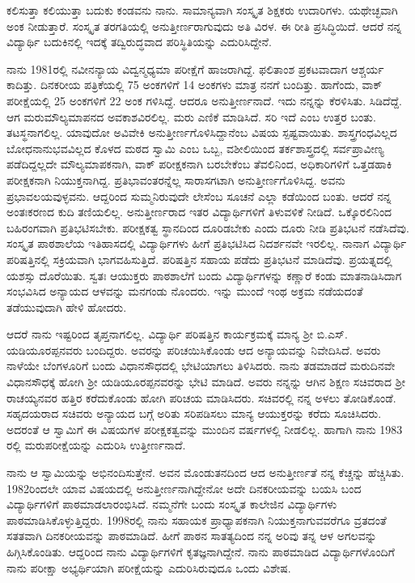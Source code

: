 {ಕಲಿಸುತ್ತಾ ಕಲಿಯುತ್ತಾ ಬದುಕು ಕಂಡವನು ನಾನು. ಸಾಮಾನ್ಯವಾಗಿ ಸಂಸ್ಕೃತ ಶಿಕ್ಷಕರು ಉದಾರಿಗಳು.  ಯಥೇಚ್ಛವಾಗಿ ಅಂಕ ನೀಡುತ್ತಾರೆ.  ಸಂಸ್ಕೃತ ತರಗತಿಯಲ್ಲಿ ಅನುತ್ತೀರ್ಣರಾಗುವುದು ಅತಿ ವಿರಳ. ಈ ರೀತಿ ಪ್ರಸಿದ್ಧಿಯಿದೆ. ಆದರೆ ನನ್ನ ವಿದ್ಯಾರ್ಥಿ ಬದುಕಿನಲ್ಲಿ ಇದಕ್ಕೆ ತದ್ವಿರುದ್ಧವಾದ ಪರಿಸ್ಥಿತಿಯನ್ನು ಎದುರಿಸಿದ್ದೇನೆ.  

ನಾನು 1981ರಲ್ಲಿ ನವೀನನ್ಯಾಯ ವಿದ್ವನ್ಮಧ್ಯಮಾ ಪರೀಕ್ಷೆಗೆ ಹಾಜರಾಗಿದ್ದೆ.  ಫಲಿತಾಂಶ ಪ್ರಕಟವಾದಾಗ ಆಶ್ಚರ್ಯ ಕಾದಿತ್ತು.  ದಿನಕರೀಯ ಪತ್ರಿಕೆಯಲ್ಲಿ 75 ಅಂಕಗಳಿಗೆ 14 ಅಂಕಗಳು ಮಾತ್ರ ನನಗೆ ಬಂದಿತ್ತು. ಹಾಗೆಂದು, ವಾಕ್ ಪರೀಕ್ಷೆಯಲ್ಲಿ 25 ಅಂಕಗಳಿಗೆ 22 ಅಂಕ ಗಳಿಸಿದ್ದೆ.  ಆದರೂ ಅನುತ್ತೀರ್ಣನಾದೆ.  ಇದು ನನ್ನನ್ನು ಕೆರಳಿಸಿತು.  ಸಿಡಿದೆದ್ದೆ. ಆಗ ಮರುಮೌಲ್ಯಮಾಪನದ ಅವಕಾಶವಿರಲಿಲ್ಲ.  ಮರು ಎಣಿಕೆ ಮಾಡಿಸಿದೆ.  ಸರಿ ಇದೆ ಎಂಬ ಉತ್ತರ ಬಂತು.  ತಟಸ್ಥನಾಗಲಿಲ್ಲ.  ಯಾವುದೋ ಅವಿವೇಕಿ ಅನುತ್ತೀರ್ಣಗೊಳಿಸಿದ್ದಾನೆಂಬ  ವಿಷಯ ಸ್ಪಷ್ಟವಾಯಿತು.  ಶಾಸ್ತ್ರಗಂಧವಿಲ್ಲದ ಬೋಧನಾನುಭವವಿಲ್ಲದ ಕೊಳದ ಮಠದ ಸ್ವಾಮಿ ಎಂಬ ಒಬ್ಬ, ವಶೀಲಿಯಿಂದ ತರ್ಕಶಾಸ್ತ್ರದಲ್ಲಿ ಸರ್ವಪ್ರಾವೀಣ್ಯ ಪಡೆದಿದ್ದಲ್ಲದೇ ಮೌಲ್ಯಮಾಪಕನಾಗಿ, ವಾಕ್ ಪರೀಕ್ಷಕನಾಗಿ ಬರಬೇಕೆಂಬ ತೆವಲಿನಿಂದ, ಅಧಿಕಾರಿಗಳಿಗೆ ಒತ್ತಡಹಾಕಿ ಪರೀಕ್ಷಕನಾಗಿ ನಿಯುಕ್ತನಾಗಿದ್ದ.  ಪ್ರತಿಭಾವಂತರನ್ನೆಲ್ಲ ಸಾರಾಸಗಟಾಗಿ ಅನುತ್ತೀರ್ಣಗೊಳಿಸಿದ್ದ.  ಅವನು ಪ್ರಭಾವಲಯವುಳ್ಳವನು.  ಆದ್ದರಿಂದ ಸುಮ್ಮನಿರುವುದೇ ಲೇಸೆಂಬ ಸೂಚನೆ ಎಲ್ಲಾ ಕಡೆಯಿಂದ ಬಂತು.  ಆದರೆ ನನ್ನ ಅಂತಃಕರಣದ ಕುದಿ ತಣಿಯಲಿಲ್ಲ.  ಅನುತ್ತೀರ್ಣರಾದ ಇತರ ವಿದ್ಯಾರ್ಥಿಗಳಿಗೆ ತಿಳುವಳಿಕೆ ನೀಡಿದೆ.  ಒಕ್ಕೊರಲಿನಿಂದ ಬಹಿರಂಗವಾಗಿ ಪ್ರತಿಭಟಿಸಬೇಕು. ಪರೀಕ್ಷಕತ್ವ ಸ್ಥಾನದಿಂದ ದೂರಿಡಬೇಕು ಎಂದು ದೂರು ನೀಡಿ ಪ್ರತಿಭಟನೆ ನಡೆಸಿದೆವು.  ಸಂಸ್ಕೃತ ಪಾಠಶಾಲೆಯ ಇತಿಹಾಸದಲ್ಲಿ ವಿದ್ಯಾರ್ಥಿಗಳು ಹೀಗೆ ಪ್ರತಿಭಟಿಸಿದ ನಿದರ್ಶನವೇ ಇರಲಿಲ್ಲ.  ನಾನಾಗ ವಿದ್ಯಾರ್ಥಿ ಪರಿಷತ್ತಿನಲ್ಲಿ ಸಕ್ರಿಯವಾಗಿ ಭಾಗವಹಿಸುತ್ತಿದೆ.  ಪರಿಷತ್ತಿನ ಸಹಾಯ ಪಡೆದು ಪ್ರತಿಭಟನೆ ಮಾಡಿದೆವು.  ಪ್ರಯತ್ನದಲ್ಲಿ ಯಶಸ್ಸು ದೊರೆಯಿತು.  ಸ್ವತಃ ಆಯುಕ್ತರು ಪಾಠಶಾಲೆಗೆ ಬಂದು ವಿದ್ಯಾರ್ಥಿಗಳನ್ನು ಕಣ್ಣಾರೆ ಕಂಡು ಮಾತನಾಡಿಸಿದಾಗ ಸಂಭವಿಸಿದ ಅನ್ಯಾಯದ ಆಳವನ್ನು ಮನಗಂಡು ನೊಂದರು.  ಇನ್ನು ಮುಂದೆ ಇಂಥ ಅಕ್ರಮ ನಡೆಯದಂತೆ ತಡೆಯುವುದಾಗಿ ಹೇಳಿ ಹೋದರು.  

ಆದರೆ ನಾನು ಇಷ್ಟರಿಂದ ತೃಪ್ತನಾಗಲಿಲ್ಲ.  ವಿದ್ಯಾರ್ಥಿ ಪರಿಷತ್ತಿನ ಕಾರ್ಯಕ್ರಮಕ್ಕೆ ಮಾನ್ಯ ಶ್ರೀ ಬಿ.ಎಸ್. ಯಡಿಯೂರಪ್ಪನವರು ಬಂದಿದ್ದರು.  ಅವರನ್ನು ಪರಿಚಯಿಸಿಕೊಂಡು ಆದ ಅನ್ಯಾಯವನ್ನು ನಿವೇದಿಸಿದೆ.  ಅವರು ನಾಳೆಯೇ ಬೆಂಗಳೂರಿಗೆ ಬಂದು ವಿಧಾನಸೌಧದಲ್ಲಿ ಭೇಟಿಯಾಗಲು ತಿಳಿಸಿದರು.  ನಾನು ತಡಮಾಡದೆ ಮರುದಿನವೇ ವಿಧಾನಸೌಧಕ್ಕೆ ಹೋಗಿ ಶ್ರೀ ಯಡಿಯೂರಪ್ಪನವರನ್ನು ಭೇಟಿ ಮಾಡಿದೆ.  ಅವರು ನನ್ನನ್ನು ಆಗಿನ ಶಿಕ್ಷಣ ಸಚಿವರಾದ ಶ್ರೀ ರಾಚಯ್ಯನವರ ಹತ್ತಿರ ಕರೆದುಕೊಂಡು ಹೋಗಿ ಪರಿಚಯ ಮಾಡಿಸಿದರು.  ಸಚಿವರಲ್ಲಿ ನನ್ನ ಅಳಲು ತೋಡಿಕೊಂಡೆ.  ಸಹೃದಯರಾದ ಸಚಿವರು ಅನ್ಯಾಯದ ಬಗ್ಗೆ ಅರಿತು ಸರಿಪಡಿಸಲು ಮಾನ್ಯ ಆಯುಕ್ತರನ್ನು ಕರೆದು ಸೂಚಿಸಿದರು.  ಅದರಂತೆ ಆ ಸ್ವಾಮಿಗೆ ಈ ವಿಷಯಗಳ ಪರೀಕ್ಷಕತ್ವವನ್ನು ಮುಂದಿನ ವರ್ಷಗಳಲ್ಲಿ ನೀಡಲಿಲ್ಲ.  ಹಾಗಾಗಿ ನಾನು 1983 ರಲ್ಲಿ ಮರುಪರೀಕ್ಷೆಯನ್ನು ಎದುರಿಸಿ ಉತ್ತೀರ್ಣನಾದೆ.  

ನಾನು ಆ ಸ್ವಾಮಿಯನ್ನು ಅಭಿನಂದಿಸುತ್ತೇನೆ.  ಅವನ ಮೊಂಡುತನದಿಂದ ಆದ ಅನುತ್ತೀರ್ಣತೆ ನನ್ನ ಕೆಚ್ಚನ್ನು ಹೆಚ್ಚಿಸಿತು.  1982ರಿಂದಲೇ ಯಾವ ವಿಷಯದಲ್ಲಿ ಅನುತ್ತೀರ್ಣನಾಗಿದ್ದೇನೋ ಅದೇ ದಿನಕರೀಯವನ್ನು ಬಯಸಿ ಬಂದ ವಿದ್ಯಾರ್ಥಿಗಳಿಗೆ ಪಾಠಮಾಡಲಾರಂಭಿಸಿದೆ. ನಮ್ಮನೆಗೇ ಬಂದು ಸಂಸ್ಕೃತ ಕಾಲೇಜಿನ ವಿದ್ಯಾರ್ಥಿಗಳು ಪಾಠಮಾಡಿಸಿಕೊಳ್ಳುತ್ತಿದ್ದರು.  1998ರಲ್ಲಿ ನಾನು ಸಹಾಯಕ ಪ್ರಾಧ್ಯಾಪಕನಾಗಿ ನಿಯುಕ್ತನಾಗುವವರೆಗೂ ವ್ರತದಂತೆ ಸತತವಾಗಿ ದಿನಕರೀಯವನ್ನು ಪಾಠಮಾಡಿದೆ.  ಹೀಗೆ ಪಾಠನ ಸಾತತ್ಯದಿಂದ ನನ್ನ ಅರಿವು ತನ್ನ ಆಳ ಅಗಲವನ್ನು ಹಿಗ್ಗಿಸಿಕೊಂಡಿತು. ಆದ್ದರಿಂದ ನಾನು ವಿದ್ಯಾರ್ಥಿಗಳಿಗೆ ಕೃತಜ್ಞನಾಗಿದ್ದೇನೆ.  ನಾನು ಪಾಠಮಾಡಿದ ವಿದ್ಯಾರ್ಥಿಗಳೊಂದಿಗೆ ನಾನು ಪರೀಕ್ಷಾ ಅಭ್ಯರ್ಥಿಯಾಗಿ ಪರೀಕ್ಷೆಯನ್ನು ಎದುರಿಸಿರುವುದೂ ಒಂದು ವಿಶೇಷ.

}
